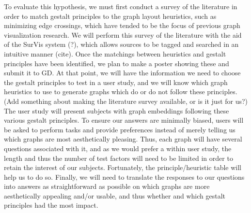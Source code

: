 \documentclass[12pt, twocolumn]{article}
\begin{document}
To evaluate this hypothesis, we must first conduct a survey of the literature in order to match gestalt principles to the graph layout heuristics, such as minimizing edge crossings, which have tended to be the focus of previous graph visualization research. 
We will perform this survey of the literature with the aid of the SurVis system (?), which allows sources to be tagged and searched in an intuitive manner (cite).
Once the matchings between heuristics and gestalt principles have been identified, we plan to make a poster showing these and submit it to GD. 
At that point, we will have the information we need to choose the gestalt principles to test in a user study, and we will know which graph heuristics to use to generate graphs which do or do not follow these principles.
\\
(Add something about making the literature survey available, or is it just for us?)
\\


The user study will present subjects with graph embeddings following these various gestalt principles.
To ensure our answers are minimally biased, users will be asked to perform tasks and provide preferences instead of merely telling us which graphs are most aesthetically pleasing.
Thus, each graph will have several questions associated with it, and as we would prefer a within user 
study, the length and thus the number of test factors will need to be limited in order to retain the interest of our subjects. 
Fortunately, the principle/heuristic table will help us to do so.
Finally, we will need to translate the responses to our questions into answers as straightforward as possible on which graphs are more aesthetically appealing and/or usable, and thus whether and which gestalt principles had the most impact. 
\\
\end{document}
